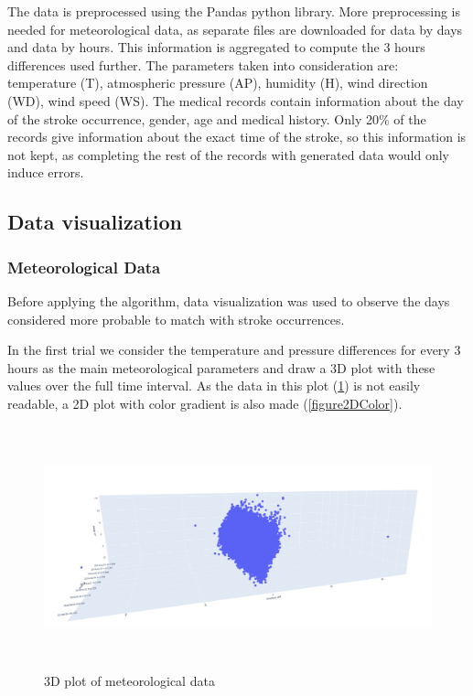 \documentclass{article}
\begin{document}
The data is preprocessed using the Pandas python library. More preprocessing is needed for meteorological data, as separate files are downloaded for data by days and data by hours. This information is aggregated to compute the 3 hours differences used further. The parameters taken into consideration are: temperature (T), atmospheric pressure (AP), humidity (H), wind direction
(WD), wind speed (WS). The medical records contain information about the day of the stroke occurrence, gender, age and medical history. Only 20\% of the records give information about the exact time of the stroke, so this information is not kept, as completing the rest of the records with generated data would only induce errors.

\subsection{Data visualization}

\subsubsection{Meteorological Data}

Before applying the algorithm, data visualization was used to observe the days considered more probable to match with stroke occurrences. 

In the first trial we consider the temperature and pressure differences for every 3 hours as the main meteorological parameters and draw a 3D plot with these values over the full time interval. As the data in this plot (\ref{figure3D}) is not easily readable, a 2D plot with color gradient is also made (\ref{figure2DColor}). 

\begin{figure}[ht] 
\centering
\includegraphics[height=7cm]{3dPlot.png} 
\caption{3D plot of meteorological data}
\label{figure3D}
\end{figure}
\end{document}
